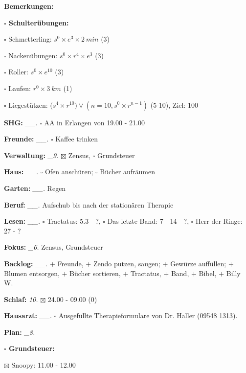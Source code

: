 \documentclass[10pt,a4paper]{article}
\newcommand\prop[1] {{\color {alizarin} {\bf #1}}}        %
\newcommand\opti[1] {{\color {amethyst} {\bf #1}}}        %
\newcommand\mand[1] {{\color {burntorange} {\bf #1}}}     %
\newcommand\topspace{\vskip -15pt \hskip 20pt}
\newcommand\bottomspace{\vskip 4pt}
\newcommand\n[1] { {\sl #1.} \hskip 5pt }
\begin{document}
\begin{mdframed}[style=daystyle]
\begin{labeling}{{\mand {Bemerkungen:}}}
\begin{minipage}{0.75\textwidth}
\begin{labeling}{\prop {$\square$ {Schulterübungen:}}}
      \item[$\square$ Schmetterling:]   $s^0 \times e^3 \times 2\ min$ (3)
      \item[$\square$ Nackenübungen:]   $s^0 \times r^4 \times e^3$ (3)
      \item[$\square$ Roller:]          $s^0 \times e^{10}$ (3)
      \item[$\square$ Laufen:]          $r^0 \times 3\ km$ (1)
      \item[$\square$ Liegestützen:]    ($s^4 \times r^{10}) \vee (n=10, s^0 \times r^{n-1})$ (5-10), Ziel: 100
      \end{labeling}
    \end{minipage}
    \bottomspace        
  \item[{\mand {SHG:}}]          \n{\_\_} $\square$ AA in Erlangen von 19.00 - 21.00
  \item[{\mand {Freunde:}}]      \n{\_\_} $\square$ Kaffee trinken
  \item[{\mand {Verwaltung:}}]    \n{\_9} $\boxtimes$ Zensus, $\square$ Grundsteuer
  \item[{\mand {Haus:}}]         \n{\_\_} $\square$ Ofen anschüren; $\square$ Bücher aufräumen
  \item[{\mand {Garten:}}]       \n{\_\_} Regen
  \item[{\mand {Beruf:}}]        \n{\_\_} Aufschub bis nach der stationären Therapie
  \item[{\mand {Lesen:}}]        \n{\_\_} $\square$ Tractatus: 5.3 - ?,
      $\square$ Das letzte Band: 7 - 14 - ?, $\square$ Herr der Ringe: 27 - ?
  \item[{\mand {Fokus:}}]         \n{\_6} Zensus, Grundsteuer
  \item[{\mand {Backlog:}}]      \n{\_\_} $+$ Freunde,
    $+$ Zendo putzen, saugen; $+$ Gewürze auffüllen; $+$ Blumen entsorgen, $+$ Bücher sortieren,
    $+$ Tractatus, $+$ Band, $+$ Bibel, $+$ Billy W.
  \item[{\mand {Schlaf:}}]         \n{10} $\boxtimes$ 24.00 - 09.00 (0)
  \item[{\opti {Hausarzt:}}]     \n{\_\_} $\square$ Ausgefüllte Therapieformulare von
    Dr. Haller (09548 1313). 
  \item[{\mand {Plan:}}]          \n{\_8}
    \topspace
    \begin{minipage}{0.75\textwidth}  
      \begin{labeling}{\prop {$\square$ {Grundsteuer:}}} 
        \setlength\itemsep{-3pt}
      \item[$\boxtimes$ Snoopy:]    11.00 - 12.00

\end{labeling}
\end{minipage}
\end{labeling}
\end{mdframed}
\end{document}
